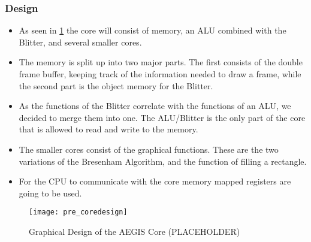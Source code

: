 \subsubsection*{Design}
\begin{itemize}
	\item As seen in \cref{img:coredes} the core will consist of memory, an ALU combined with the Blitter, and several smaller cores.
	\item The memory is split up into two major parts. The first consists of the double frame buffer, keeping track of the information needed to draw a frame, while the second part is the object memory for the Blitter.
	\item As the functions of the Blitter correlate with the functions of an ALU, we decided to merge them into one. The ALU/Blitter is the only part of the core that is allowed to read and write to the memory.
	\item The smaller cores consist of the graphical functions. These are the two variations of the Bresenham Algorithm, and the function of filling a rectangle.
	\item For the CPU to communicate with the core memory mapped registers are going to be used.
\end{itemize}

\begin{figure}[H]
	\centering
	\texttt{[image: pre\_coredesign]}
	\caption{Graphical Design of the AEGIS Core (PLACEHOLDER)}
	\label{img:coredes}
\end{figure}
